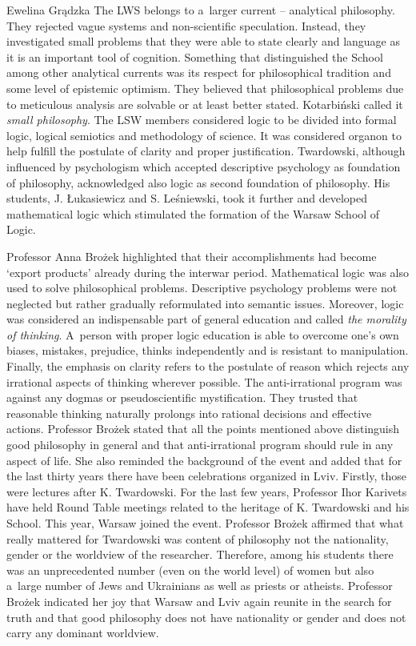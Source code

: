 \begin{editorialeng}{Ewelina Grądzka}
The LWS belongs to a~larger current – analytical philosophy. They rejected vague systems and non-scientific speculation. Instead, they investigated small problems that they were able to state clearly and language as it is an important tool of cognition. Something that distinguished the School among other analytical currents was its respect for philosophical tradition and some level of epistemic optimism. They believed that philosophical problems due to meticulous analysis are solvable or at least better stated. Kotarbiński called it \textit{small philosophy}. The LSW members considered logic to be divided into formal logic, logical semiotics and methodology of science. It was considered organon to help fulfill the postulate of clarity and proper justification. Twardowski, although influenced by psychologism which accepted descriptive psychology as foundation of philosophy, acknowledged also logic as second foundation of philosophy. His students, J. Łukasiewicz and S. Leśniewski, took it further and developed mathematical logic which stimulated the formation of the Warsaw School of Logic.

Professor Anna Brożek highlighted that their accomplishments had become ‘export products’ already during the interwar period. Mathematical logic was also used to solve philosophical problems. Descriptive psychology problems were not neglected but rather gradually reformulated into semantic issues. Moreover, logic was considered an indispensable part of general education and called \textit{the morality of thinking}. A~person with proper logic education is able to overcome one’s own biases, mistakes, prejudice, thinks independently and is resistant to manipulation. Finally, the emphasis on clarity refers to the postulate of reason which rejects any irrational aspects of thinking wherever possible. The anti-irrational program was against any dogmas or pseudoscientific mystification. They trusted that reasonable thinking naturally prolongs into rational decisions and effective actions. Professor Brożek stated that all the points mentioned above distinguish good philosophy in general and that anti-irrational program should rule in any aspect of life. She also reminded the background of the event and added that for the last thirty years there have been celebrations organized in Lviv. Firstly, those were lectures after K. Twardowski. For the last few years, Professor Ihor Karivets have held Round Table meetings related to the heritage of K. Twardowski and his School. This year, Warsaw joined the event. Professor Brożek affirmed that what really mattered for Twardowski was content of philosophy not the nationality, gender or the worldview of the researcher. Therefore, among his students there was an unprecedented number (even on the world level) of women but also a~large number of Jews and Ukrainians as well as priests or atheists. Professor Brożek indicated her joy that Warsaw and Lviv again reunite in the search for truth and that good philosophy does not have nationality or gender and does not carry any dominant worldview.


\end{editorialeng}
